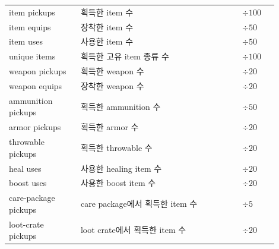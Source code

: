 \begin{table}[t]
\begin{tabular}{p{0.24\linewidth}p{0.54\linewidth}p{0.12\linewidth}}
item pickups & 획득한 item 수 & \(\div 100\) \\
item equips & 장착한 item 수 & \(\div 50\) \\
item uses & 사용한 item 수 & \(\div 50\) \\
unique items & 획득한 고유 item 종류 수 & \(\div 100\) \\
weapon pickups & 획득한 weapon 수 & \(\div 20\) \\
weapon equips & 장착한 weapon 수 & \(\div 20\) \\
ammunition pickups & 획득한 ammunition 수 & \(\div 50\) \\
armor pickups & 획득한 armor 수 & \(\div 20\) \\
throwable pickups & 획득한 throwable 수 & \(\div 20\) \\
heal uses & 사용한 healing item 수 & \(\div 20\) \\
boost uses & 사용한 boost item 수 & \(\div 20\) \\
care-package pickups & care package에서 획득한 item 수 & \(\div 5\) \\
loot-crate pickups & loot crate에서 획득한 item 수 & \(\div 20\) \\
\bottomrule
\end{tabular}
\end{table}
